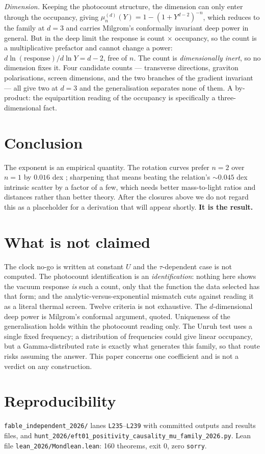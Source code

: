 \documentclass[11pt,letterpaper]{article}
\begin{document}
\emph{Dimension.} Keeping the photocount structure, the dimension can only enter through the occupancy, giving $\mu_n^{(d)}(Y)=1-(1+Y^{d-2})^{-n}$, which reduces to the family at $d=3$ and carries Milgrom's conformally invariant deep power in general. But in the deep limit the response is count $\times$ occupancy, so the count is a multiplicative prefactor and cannot change a power: $d\ln(\text{response})/d\ln Y=d-2$, free of $n$. The count is \emph{dimensionally inert}, so no dimension fixes it. Four candidate counts --- transverse directions, graviton polarisations, screen dimensions, and the two branches of the gradient invariant --- all give two at $d=3$ and the generalisation separates none of them. A by-product: the equipartition reading of the occupancy is specifically a three-dimensional fact.

\section{Conclusion}
The exponent is an empirical quantity. The rotation curves prefer $n=2$ over $n=1$ by $0.016$ dex \cite{paper27}; sharpening that means beating the relation's $\sim0.045$ dex intrinsic scatter by a factor of a few, which needs better mass-to-light ratios and distances rather than better theory. After the closures above we do not regard this as a placeholder for a derivation that will appear shortly. \textbf{It is the result.}

\section{What is not claimed}
The clock no-go is written at constant $U$ and the $\tau$-dependent case is not computed. The photocount identification is an \emph{identification}: nothing here shows the vacuum response \emph{is} such a count, only that the function the data selected has that form; and the analytic-versus-exponential mismatch cuts against reading it as a literal thermal screen. Twelve criteria is not exhaustive. The $d$-dimensional deep power is Milgrom's conformal argument, quoted. Uniqueness of the generalisation holds within the photocount reading only. The Unruh test uses a single fixed frequency; a distribution of frequencies could give linear occupancy, but a Gamma-distributed rate is exactly what generates this family, so that route risks assuming the answer. This paper concerns one coefficient and is not a verdict on any construction.

\section{Reproducibility}
\texttt{fable\_independent\_2026/} lanes \texttt{L235}--\texttt{L239} with committed outputs and results files, and \texttt{hunt\_2026/eft01\_positivity\_causality\_mu\_family\_2026.py}. Lean file \texttt{lean\_2026/Mondlean.lean}: 160 theorems, exit 0, zero \texttt{sorry}.
\end{document}

